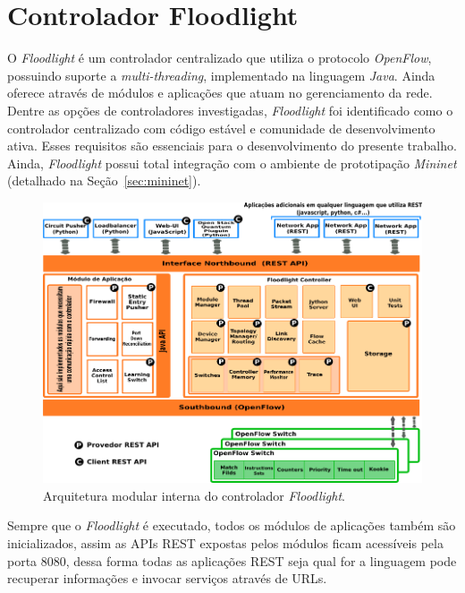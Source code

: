 \section{Controlador Floodlight}
\label{sec:floodlight}

O \textit{Floodlight} é um controlador centralizado que utiliza o protocolo \textit{OpenFlow}, possuindo suporte a \textit{multi-threading}, implementado na linguagem \textit{Java}. Ainda oferece através de módulos e aplicações que atuam no gerenciamento da rede.
Dentre as opções de controladores investigadas, \textit{Floodlight} foi identificado como o controlador centralizado com código estável e comunidade de desenvolvimento ativa.
Esses requisitos são essenciais para o desenvolvimento do presente trabalho.
Ainda, \textit{Floodlight} possui total integração com o ambiente de prototipação \textit{Mininet} (detalhado na Seção~\ref{sec:mininet}).

\begin{figure}[!htb]
	\caption{\label{fig:Floodlight-Diagram} Arquitetura modular interna do controlador \textit{Floodlight}.}
	\begin{center}
	    \includegraphics[scale=0.55]{imagens/arquitetura_floodlight_2.png}
	\end{center}
\end{figure}

Sempre que o \textit{Floodlight} é executado, todos os módulos de aplicações também são inicializados, assim as APIs REST expostas pelos módulos ficam acessíveis pela porta 8080, dessa forma todas as aplicações REST seja qual for a linguagem pode recuperar informações e invocar serviços através de URLs.

